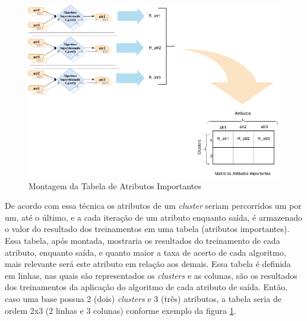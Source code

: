 \begin{figure}[h!]
        \centering
        \includegraphics[scale=0.5]{figs/montagem_matrizAtribImp.png}
        \caption{Montagem da Tabela de Atributos Importantes } \label{fig:matribimp}
\end{figure}




De acordo com essa técnica os atributos de um \textit{cluster} seriam percorridos um por um, até o último, e a cada iteração de um atributo enquanto saída, é armazenado o valor do resultado dos treinamentos em uma tabela (atributos importantes). Essa tabela, após montada, mostraria os resultados do treinamento de cada atributo, enquanto saída, e quanto maior a taxa de acerto de cada algoritmo, mais relevante será este atributo em relação aos demais. Essa tabela é definida em linhas, nas quais são representados os \textit{clusters} e  as colunas, são os resultados dos treinamentos da aplicação do algoritmo de cada atributo de saída. Então, caso uma base possua 2 (dois) \textit{clusters} e 3 (três) atributos, a tabela seria de ordem 2x3 (2 linhas e 3 colunas) conforme exemplo da figura  \ref{fig:matribimp}.


